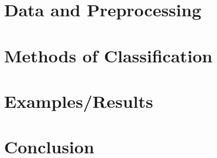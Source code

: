 \documentclass[midd]{thesis}
\begin{document}
\chapter{Data and Preprocessing}

\chapter{Methods of Classification}

\chapter{Examples/Results}

\chapter{Conclusion}


\appendix
\nocite{*}


\end{document}
